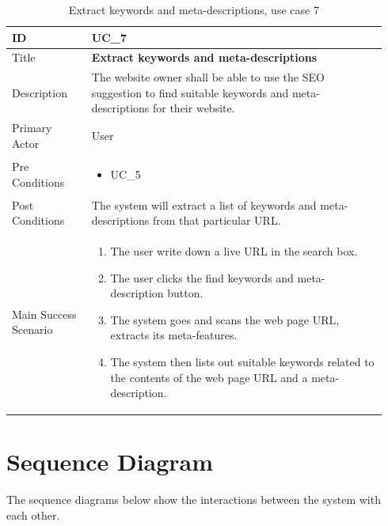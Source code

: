 \documentclass{scrartcl}
\begin{document}
\begin{table}[H]
  \caption{Extract keywords and meta-descriptions, use case 7}
  \begin{tabular}{p{0.20\linewidth} | p{0.74\linewidth}}
    \toprule
    ID & UC\_7
    \\\midrule
    Title & \textbf{Extract keywords and meta-descriptions}
    \\\hline
    Description & The website owner shall be able to use the SEO suggestion to find suitable keywords and meta-descriptions for their website.
    \\\hline
    Primary Actor & User
    \\\hline
    Pre Conditions & {
                     \begin{itemize}
                     \item UC\_5
                     \end{itemize}
                     }\vspace*{-\baselineskip}
    \\\hline
    Post Conditions & The system will extract a list of keywords and meta-descriptions from that particular URL.
    \\\hline
    Main Success Scenario & {
                            \begin{enumerate}
                            \item The user write down a live URL in the search box.
                            \item The user clicks the find keywords and meta-description button.
                            \item The system goes and scans the web page URL, extracts its meta-features.
                            \item The system then lists out suitable keywords related to the contents of the web page URL and a meta-description.
                            \end{enumerate}
                            }\vspace*{-\baselineskip}
    \\\bottomrule
  \end{tabular}
\end{table}

\section{Sequence Diagram}

The sequence diagrams below show the interactions between the system with each other.
\end{document}
